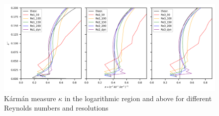 \documentclass[a4paper,11pt]{article}
\providecommand{\DIFaddbeginFL}{} %
\providecommand{\DIFaddendFL}{} %
\providecommand{\DIFdelbeginFL}{} %
\providecommand{\DIFdelendFL}{} %
\begin{document}
\begin{figure}[ht]
  \centerline{
	  \includegraphics[width=\textwidth]{figures_2024/d3y_3Re_kappa}
  }
  \caption{K\'arm\'an measure $\kappa$ in the logarithmic region and above for different Reynolds numbers and resolutions}
  \DIFdelbeginFL %
\DIFdelendFL \DIFaddbeginFL \label{fig:3Re_kappa}
\DIFaddendFL \end{figure}
\end{document}
